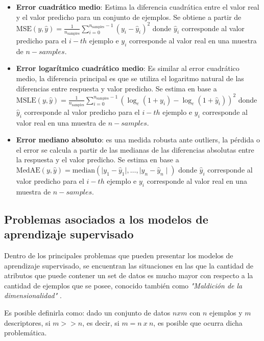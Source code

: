 \begin{itemize}
	\item \textbf{Error cuadrático medio}: Estima la diferencia cuadrática entre el valor real y el valor predicho para un conjunto de ejemplos. Se obtiene a partir de $\text{MSE}(y, \hat{y}) = \frac{1}{n_\text{samples}} \sum_{i=0}^{n_\text{samples} - 1} (y_i - \hat{y}_i)^2$ donde $\hat{y}_i$ corresponde al valor predicho para el $i-th$ ejemplo e $y_{i}$ corresponde al valor real en una muestra de $n-samples$.
		
	\item \textbf{Error logarítmico cuadrático medio}: Es similar al error cuadrático medio, la diferencia principal es que se utiliza el logaritmo natural de las diferencias entre respuesta y valor predicho. Se estima en base a $\text{MSLE}(y, \hat{y}) = \frac{1}{n_\text{samples}} \sum_{i=0}^{n_\text{samples} - 1} (\log_e (1 + y_i) - \log_e (1 + \hat{y}_i) )^2$ donde $\hat{y}_i$ corresponde al valor predicho para el $i-th$ ejemplo e $y_{i}$ corresponde al valor real en una muestra de $n-samples$.
		
	\item \textbf{Error mediano absoluto}: es una medida robusta ante outliers, la pérdida o el error se calcula a partir de las medianas de las diferencias absolutas entre la respuesta y el valor predicho. Se estima en base a $\text{MedAE}(y, \hat{y}) = \text{median}(\mid y_1 - \hat{y}_1 \mid, \ldots, \mid y_n - \hat{y}_n \mid)$ donde $\hat{y}_i$ corresponde al valor predicho para el $i-th$ ejemplo e $y_{i}$ corresponde al valor real en una muestra de $n-samples$.
		
		
\end{itemize}

\subsection{Problemas asociados a los modelos de aprendizaje supervisado}

Dentro de los principales problemas que pueden presentar los modelos de aprendizaje supervisado, se encuentran las situaciones en las que la cantidad de atributos que puede contener un set de datos es mucho mayor con respecto a la cantidad de ejemplos que se posee, conocido también como \textit{"Maldición de la dimensionalidad"} \cite{indyk1998approximate}.

Es posible definirla como: dado un conjunto de datos $nxm$ con $n$ ejemplos y $m$ descriptores, si $m >> n$, es decir, si $m= n\ x\ n$, es posible que ocurra dicha problemática.

